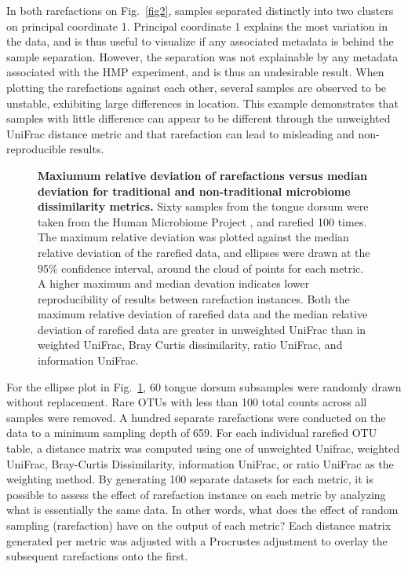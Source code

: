 \documentclass[10pt,letterpaper]{article}
\begin{document}
In both rarefactions on Fig.~\ref{fig2}, samples separated distinctly into two clusters on principal coordinate 1. Principal coordinate 1 explains the most variation in the data, and is thus useful to visualize if any associated metadata is behind the sample separation. However, the separation was not explainable by any metadata associated with the HMP experiment, and is thus an undesirable result. When plotting the rarefactions against each other, several samples are observed to be unstable, exhibiting large differences in location. This example demonstrates that samples with little difference can appear to be different through the unweighted UniFrac distance metric and that rarefaction can lead to misleading and non-reproducible results.

\begin{figure}[h]
\caption[Maxiumum relative deviation of rarefactions versus median deviation for traditional and non-traditional microbiome dissimilarity metrics.]{{\bf Maxiumum relative deviation of rarefactions versus median deviation for traditional and non-traditional microbiome dissimilarity metrics.} Sixty samples from the tongue dorsum were taken from the Human Microbiome Project \cite{turnbaugh2007human}, and rarefied 100 times. The maximum relative deviation was plotted against the median relative deviation of the rarefied data, and ellipses were drawn at the 95\% confidence interval, around the cloud of points for each metric. A higher maximum and median devation indicates lower reproducibility of results between rarefaction instances. Both the maximum relative deviation of rarefied data and the median relative deviation of rarefied data are greater in unweighted UniFrac than in weighted UniFrac, Bray Curtis dissimilarity, ratio UniFrac, and information UniFrac.}
\label{fig3}
\end{figure}

For the ellipse plot in Fig.~\ref{fig3}, 60 tongue dorsum subsamples were randomly drawn without replacement. Rare OTUs with less than 100 total counts across all samples were removed. A hundred separate rarefactions were conducted on the data to a minimum sampling depth of 659. For each individual rarefied OTU table, a distance matrix was computed using one of unweighted Unifrac, weighted UniFrac, Bray-Curtis Dissimilarity, information UniFrac, or ratio UniFrac as the weighting method. By generating 100 separate datasets for each metric, it is possible to assess the effect of rarefaction instance on each metric by analyzing what is essentially the same data. In other words, what does the effect of random sampling (rarefaction) have on the output of each metric? Each distance matrix generated per metric was adjusted with a Procrustes adjustment to overlay the subsequent rarefactions onto the first.
\end{document}
